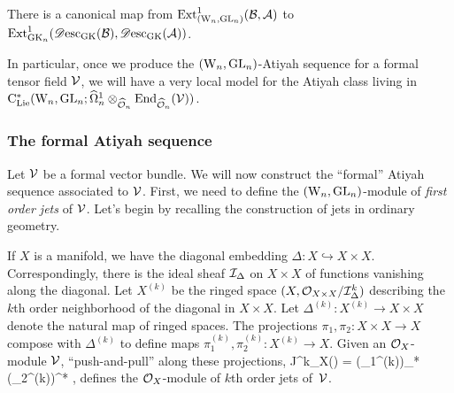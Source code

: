 \begin{cor}
There is a canonical map from ${\rm Ext}^1_{({{\rm W}_n}, {\rm GL}_n)}(\mathcal B,\mathcal{A})$ to ${\rm Ext}^1_{{\rm GK}_n}(\mathscr{D}{\rm esc}_{\rm GK}(\mathcal B), \mathscr{D}{\rm esc}_{\rm GK}(\mathcal{A}))$.
\end{cor}

In particular, once we produce the $({{\rm W}_n}, {\rm GL}_n)$-Atiyah sequence for a formal tensor field $\mathcal{V}$, 
we will have a very local model for the Atiyah class living in ${\rm C}_{{\rm Lie}}^*({{\rm W}_n},{\rm GL}_n; \widehat{\Omega}^1_n \otimes_{\widehat{\mathcal O}_n} {\rm End}_{\widehat{\mathcal O}_n}(\mathcal{V}))$.



\subsubsection{The formal Atiyah sequence} \label{sec gk cc}

Let $\mathcal{V}$ be a formal vector bundle. 
We will now construct the ``formal'' Atiyah sequence associated to $\mathcal{V}$.  
First, we need to define the $({{\rm W}_n}, {\rm GL}_n)$-module of {\em first order jets} of $\mathcal{V}$. 
Let's begin by recalling the construction of jets in ordinary geometry.

If $X$ is a manifold, we have the diagonal embedding $\Delta : X \hookrightarrow X \times X$. 
Correspondingly, there is the ideal sheaf $\mathcal{I}_\Delta$ on $X \times X$ of functions vanishing along the diagonal. 
Let $X^{(k)}$ be the ringed space $(X, \mathcal O_{X \times X}/\mathcal{I}_\Delta^k)$ 
describing the $k$th order neighborhood of the diagonal in $X \times X$. 
Let $\Delta^{(k)} : X^{(k)} \to X \times X$ denote the natural map of ringed spaces.
The projections $\pi_1, \pi_2 : X \times X \to X$ compose with $\Delta^{(k)}$ 
to define maps $\pi^{(k)}_1, \pi_2^{(k)} : X^{(k)} \to X$. 
Given an $\mathcal O_X$-module $\mathcal{V}$, 
``push-and-pull'' along these projections,
\ben
J^k_X(\cV) = (\pi_1^{(k)})_* (\pi_2^{(k)})^* \cV,
\een
defines the $\mathcal O_X$-module of $k$th order jets of~$\mathcal{V}$.

